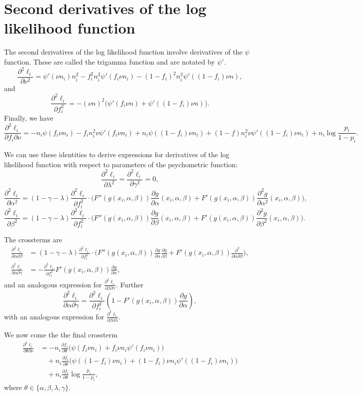 \documentclass[a4paper,11pt]{scrartcl}
\def\p{\partial}
\def\ddlnu{\frac{\p^2\ell_i}{\p\nu^2}}
\def\ddlf{\frac{\p^2\ell_i}{\p f_i^2}}
\def\ddlfnu{\frac{\p^2\ell_i}{\p f_i\p\nu}}
\def\dfdt{\frac{\p f_i}{\p\theta}}
\begin{document}
\section{Second derivatives of the log likelihood function}

The second derivatives of the log likelihood function involve derivatives of the $\psi$ function.
These are called the trigamma function and are notated by $\psi'$.
%
$$
\ddlnu = \psi' (\nu n_i) n_i^2 - f_i^2 n_i^2\psi' (f_i\nu n_i) - (1-f_i)^2n_i^2 \psi' ( (1-f_i)\nu n),
$$
%
and
%
$$
\ddlf = - (\nu n)^2 \Big(\psi' ( f_i \nu n) + \psi'( (1-f_i)\nu n) \Big).
$$
Finally, we have
%
$$
\ddlfnu = - n_i \psi ( f_i \nu n_i ) - f_i n_i^2\nu \psi' ( f_i\nu n_i ) + n_i\psi( (1-f_i)\nu n_i) + (1-f)n_i^2\nu\psi'( (1-f_i)\nu n_i) + n_i \log\frac{p_i}{1-p_i}.
$$
%

We can use these identities to derive expressions for derivatives of the log likelihood function with respect to parameters of the psychometric function:
%
$$
\frac{\p^2 \ell_i}{\p \lambda^2} = \frac{\p^2\ell_i}{\p \gamma^2} = 0,
$$
%
$$
\frac{\p^2\ell_i}{\p\alpha^2} = (1-\gamma-\lambda) \ddlf \cdot \Big( F''(g(x_i,\alpha,\beta))\frac{\p g}{\p\alpha}(x_i,\alpha,\beta) + F'(g(x_i,\alpha,\beta))\frac{\p^2g}{\p\alpha^2}(x_i,\alpha,\beta)\Big),
$$
%
$$
\frac{\p^2\ell_i}{\p\beta^2} = (1-\gamma-\lambda) \ddlf \cdot \Big( F''(g(x_i,\alpha,\beta))\frac{\p g}{\p\beta}(x_i,\alpha,\beta) + F'(g(x_i,\alpha,\beta))\frac{\p^2g}{\p\beta^2}(x_i,\alpha,\beta)\Big).
$$
%

The crossterms are
%
\begin{align*}
\frac{\p^2\ell_i}{\p\alpha\p\beta} &= (1-\gamma-\lambda)\ddlf\cdot \Big( F''(g(x_i,\alpha,\beta))\frac{\p g}{\p\alpha}\frac{\p g}{\p\beta} + F'(g(x_i,\alpha,\beta))\frac{\p^2}{\p\alpha\p\beta}\Big), \\
\frac{\p^2\ell_i}{\p\alpha\p\gamma} &= - \ddlf F'(g(x_i,\alpha,\beta)) \frac{\p g}{\p\alpha},
\end{align*}
%
and an analogous expression for $\frac{\p^2\ell_i}{\p\beta\p\gamma}$.
Further
%
$$
\frac{\p^2\ell_i}{\p\alpha\p\gamma} = \ddlf (1-F'(g(x_i,\alpha,\beta)) \frac{\p g}{\p\alpha}),
$$
%
with an analogous expression for $\frac{\p^2\ell_i}{\p\beta\p\lambda}$.

We now come the the final crossterm
%
\begin{align*}
\frac{\p^2\ell_i}{\p\theta\p\nu} &= 
    - n_i\dfdt \Big ( \psi (f_i \nu n_i) + f_i\nu n_i \psi'(f_i\nu n_i)\Big)\\
    &\quad+ n_i\dfdt \Big ( \psi ( (1-f_i)\nu n_i) + (1-f_i)\nu n_i\psi'( (1-f_i)\nu n_i) \Big)\\
    &\quad+ n_i\dfdt \log\frac{p_i}{1-p_i},
\end{align*}
%
where $\theta \in\{\alpha,\beta,\lambda,\gamma\}$.
\end{document}
